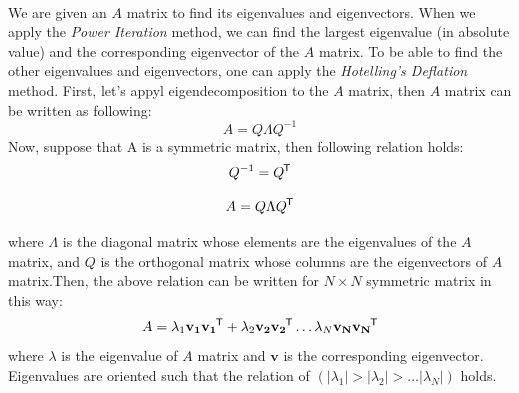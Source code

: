 \documentclass[letterpaper,12pt]{article}
\newcommand*{\tran}{^{\mkern-1.5mu\mathsf{T}}}
\begin{document}
\paragraph{} We are given an $A$ matrix to find its eigenvalues and eigenvectors. When we apply the \textit{Power Iteration} method, we can find the largest eigenvalue (in absolute value) and the corresponding eigenvector of the $A$ matrix. To be able to find the other eigenvalues and eigenvectors, one can apply the \textit{Hotelling's Deflation} method. First, let's appyl eigendecomposition to the $A$ matrix, then $A$ matrix can be written as following:
\begin{equation*}
   A = Q \Lambda Q^{-1}
\end{equation*}
Now, suppose that A is a symmetric matrix, then following relation holds:
\begin{equation}
   \label{eqn:inveqtrans}
   Q^{-1} = Q \tran
\end{equation}

\begin{equation*}
   A = Q \Lambda Q \tran
\end{equation*}

where $\Lambda$ is the diagonal matrix whose elements are the eigenvalues of the $A$ matrix, and $Q$ is the orthogonal matrix whose columns are the eigenvectors of $A$ matrix.Then, the above relation can be written for $N \times N$ symmetric matrix in this way:
\begin{equation}
   \label{eqn:symmatrix}
   A = \lambda_1 \mathbf{v_1} \mathbf{v_1}\tran + \lambda_2 \mathbf{v_2} \mathbf{v_2}\tran \dots \lambda_N \mathbf{v_N} \mathbf{v_N}\tran  
\end{equation}
where $\lambda$ is the eigenvalue of $A$ matrix and $\mathbf{v}$ is the corresponding eigenvector. Eigenvalues are oriented such that the relation of $\left(\left\lvert \lambda_1\right\rvert > \left\lvert \lambda_2\right\rvert > \dots \left\lvert \lambda_N\right\rvert\right)$ holds.
\end{document}
